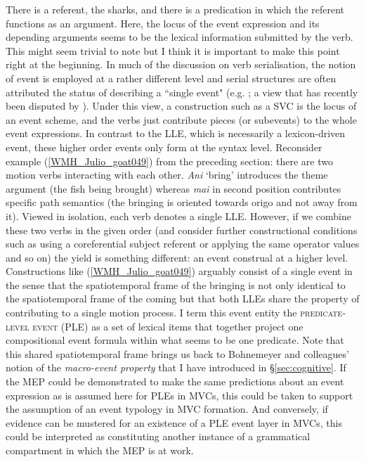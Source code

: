 There is a referent, the sharks, and there is a predication in which the referent functions as an argument. Here, the locus of the event expression and its depending arguments seems to be the lexical information submitted by the verb. This might seem trivial to note but I think it is important to make this point right at the beginning. In much of the discussion on verb serialisation, the notion of event is employed at a rather different level and serial structures are often attributed the status of describing a ``single event" (e.g. \citealt{comrie1995serial, Aikhenvald2006}; a view that has recently been disputed by \citealt{baker2010complex}). Under this view, a construction such as a SVC is the locus of an event scheme, and the verbs just contribute pieces (or subevents) to the whole event expressions. In contrast to the LLE, which is necessarily a lexicon-driven event, these higher order events only form at the syntax level. Reconsider example (\ref{WMH_Julio_goat049}) from the preceding section: there are two motion verbs interacting with each other. \textit{Ani} `bring' introduces the theme argument (the fish being brought) whereas \textit{mai} in second position contributes specific path semantics (the bringing is oriented towards origo and not away from it). Viewed in isolation, each verb denotes a single LLE. However, if we combine these two verbs in the given order (and consider further constructional conditions such as using a coreferential subject referent or applying the same operator values and so on) the yield is something different: an event construal at a higher level. Constructions like (\ref{WMH_Julio_goat049}) arguably consist of a single event in the sense that the spatiotemporal frame of the bringing is not only identical to the spatiotemporal frame of the coming but that both LLEs share the property of contributing to a single motion process. I term this event entity the \textsc{predicate-level event} (PLE) as a set of lexical items that together project one compositional event formula within what seems to be one predicate. Note that this shared spatiotemporal frame brings us back to Bohnemeyer and colleagues' notion of the \textit{macro-event property} that I have introduced in §\ref{sec:cognitive}. If the MEP could be demonstrated to make the same predictions about an event expression as is assumed here for PLEs in MVCs, this could be taken to support the assumption of an event typology in MVC formation. And conversely, if evidence can be mustered for an existence of a PLE event layer in MVCs, this could be interpreted as constituting another instance of a grammatical compartment in which the MEP is at work.

